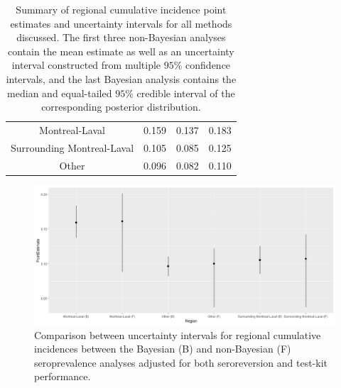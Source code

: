 \begin{table}[]
\begin{tabular}{c|ccc}
Montreal-Laval             & 0.159               & 0.137                  & 0.183                  \\
Surrounding Montreal-Laval & 0.105               & 0.085                  & 0.125                  \\
Other                      & 0.096               & 0.082                  & 0.110                 
\end{tabular}
\caption{Summary of regional cumulative incidence point estimates and uncertainty intervals for all methods discussed. The first three non-Bayesian analyses contain the mean estimate as well as an uncertainty interval constructed from multiple $95$\% confidence intervals, and the last Bayesian analysis contains the median and equal-tailed $95$\% credible interval of the corresponding posterior distribution.}
\label{tab:results}
\end{table}

\captionsetup[subfigure]{labelformat=empty}
\begin{figure}[H]
\centering
    \includegraphics[width=\columnwidth]{../../plot/intervals.png}
    \caption{Comparison between uncertainty intervals for regional cumulative incidences between the Bayesian (B) and non-Bayesian (F) seroprevalence analyses adjusted for both seroreversion and test-kit performance.}
    \label{fig:intervals}
\end{figure}